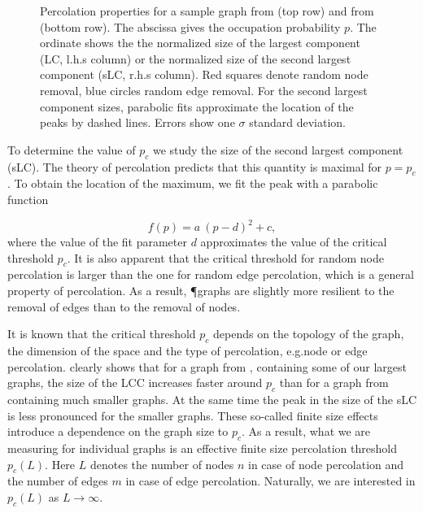 		\begin{figure}
			\centering
			\qquad
			\newline
			\qquad

			
			\caption[Percolation properties.]{Percolation properties for a sample graph from  (top row) and from  (bottom row). The abscissa gives the occupation probability $p$. The ordinate shows the the normalized size of the largest component (LC, l.h.s column) or the normalized size of the second largest component (sLC, r.h.s column). Red squares denote random node removal, blue circles random edge removal. For the second largest component sizes, parabolic fits approximate the location of the peaks by dashed lines. Errors show one $\sigma$ standard deviation.}
			\label{fig:percolation_observables}
		\end{figure}

		
		To determine the value of $p_c$ we study the size of the second largest component (sLC). The theory of percolation predicts that this quantity is maximal for $p=p_c$. To obtain the location of the maximum, we fit the peak with a parabolic function

		\begin{equation}
			f(p) = a \ (p-d)^2 + c,
		\end{equation}
		where the value of the fit parameter $d$ approximates the value of the critical threshold $p_c$. It is also apparent that the critical threshold for random node percolation is larger than the one for random edge percolation, which is a general property of percolation. As a result, \P graphs are slightly more resilient to the removal of edges than to the removal of nodes.

		It is known that the critical threshold $p_c$ depends on the topology of the graph, the dimension of the space and the type of percolation, e.g.node or edge percolation.  clearly shows that for a graph from , containing some of our largest graphs, the size of the LCC increases faster around $p_c$ than for a graph from  containing much smaller graphs. At the same time the peak in the size of the sLC is less pronounced for the smaller graphs. These so-called finite size effects introduce a dependence on the graph size to $p_c$. As a result, what we are measuring for individual graphs is an effective finite size percolation threshold $p_c(L)$. Here $L$ denotes the number of nodes $n$ in case of node percolation and the number of edges $m$ in case of edge percolation. Naturally, we are interested in $p_c(L)$ as $L \to \infty$. 

